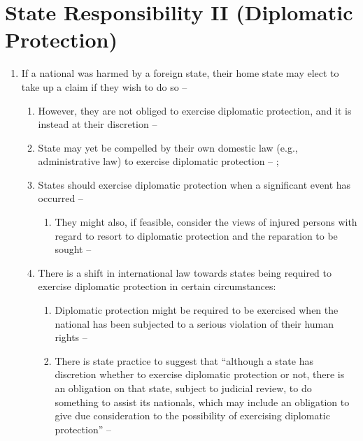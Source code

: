 \section{State Responsibility II (Diplomatic Protection)} 
\begin{enumerate}
    \item If a national was harmed by a foreign state, their home state may elect to take up a claim if they wish to do so -- 
    \begin{enumerate}
        \item However, they are not obliged to exercise diplomatic protection, and it is instead at their discretion -- 
        \item State may yet be compelled by their own domestic law (e.g., administrative law) to exercise diplomatic protection -- ; 
        \item States should exercise diplomatic protection when a significant event has occurred -- 
        \begin{enumerate}
            \item They might also, if feasible, consider the views of injured persons with regard to resort to diplomatic protection and the reparation to be sought -- 
        \end{enumerate}
        \item There is a shift in international law towards states being required to exercise diplomatic protection in certain circumstances:
        \begin{enumerate}
            \item Diplomatic protection might be required to be exercised when the national has been subjected to a serious violation of their human rights -- 
            \item There is state practice to suggest that ``although a state has discretion whether to exercise diplomatic protection or not, there is an obligation on that state, subject to judicial review, to do something to assist its nationals, which may include an obligation to give due consideration to the possibility of exercising diplomatic protection'' -- 

\end{enumerate}
\end{enumerate}
\end{enumerate}
